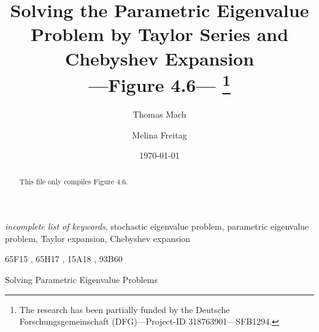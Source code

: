 \documentclass[final]{siamltex}
\title{Solving the Parametric Eigenvalue Problem by Taylor Series and Chebyshev
  Expansion\\---Figure 4.6---%
  \thanks{The research has been partially funded by the Deutsche
Forschungsgemeinschaft (DFG)---Project-ID 318763901---SFB1294.}
}
\author{Thomas Mach\footnotemark[3]\and Melina Freitag\footnotemark[3]}
\begin{document}
\maketitle

\renewcommand{\thefootnote}{\fnsymbol{footnote}}

%



\renewcommand{\thefootnote}{\arabic{footnote}}


\date{\today}
\maketitle

\begin{abstract}
  This file only compiles Figure 4.6.
\end{abstract}

\begin{keywords}
\textit{incomplete list of keywords}, %
stochastic eigenvalue problem, %
parametric eigenvalue problem, %
Taylor expansion, %
Chebyshev expansion
\end{keywords}

\begin{AMS}
  65F15%
  , 65H17%
  , 15A18%
  , 93B60%
\end{AMS}

\pagestyle{myheadings} %
\thispagestyle{plain} %
\markboth{%
}%
{Solving Parametric Eigenvalue Problems}



\end{document}
